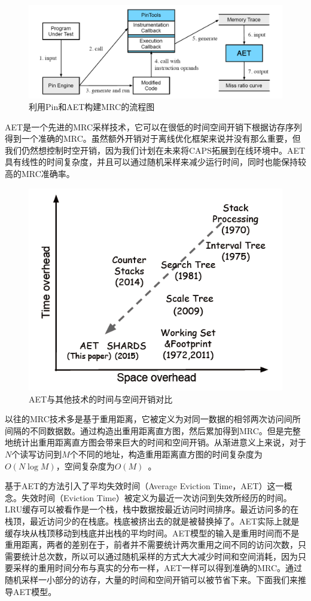 \begin{figure}[htbp] 
    \centering
    \includegraphics[width=0.8\linewidth]{figures/pin.png}
    \caption{利用Pin和AET构建MRC的流程图}
    \label{fig:pin}
\end{figure}

AET是一个先进的MRC采样技术，它可以在很低的时间空间开销下根据访存序列得到一个准确的MRC。虽然额外开销对于离线优化框架来说并没有那么重要，但我们仍然想控制时空开销，因为我们计划在未来将CAPS拓展到在线环境中。AET具有线性的时间复杂度，并且可以通过随机采样来减少运行时间，同时也能保持较高的MRC准确率。

\begin{figure}[htbp] 
    \centering
    \includegraphics[width=0.8\linewidth]{figures/AET_overhead.png}
    \caption{AET与其他技术的时间与空间开销对比}
    \label{fig:AET_overhead}
\end{figure}

以往的MRC技术多是基于重用距离，它被定义为对同一数据的相邻两次访问间所间隔的不同数据数。通过构造出重用距离直方图，然后累加得到MRC。但是完整地统计出重用距离直方图会带来巨大的时间和空间开销。从渐进意义上来说，对于$N$个读写访问到$M$个不同的地址，构造重用距离直方图的时间复杂度为$O(N\log M)$，空间复杂度为$O(M)$~\cite{olken1981efficient}。

基于AET的方法引入了平均失效时间（Average Eviction Time，AET）这一概念。失效时间（Eviction Time）被定义为最近一次访问到失效所经历的时间。LRU缓存可以被看作是一个栈，栈中数据按最近访问时间排序。最近访问多的在栈顶，最近访问少的在栈底。栈底被挤出去的就是被替换掉了。AET实际上就是缓存块从栈顶移动到栈底并出栈的平均时间。AET模型的输入是重用时间而不是重用距离，两者的差别在于，前者并不需要统计两次重用之间不同的访问次数，只需要统计总次数，所以可以通过随机采样的方式大大减少时间和空间消耗，因为只要采样的重用时间分布与真实的分布一样，AET一样可以得到准确的MRC。通过随机采样一小部分的访存，大量的时间和空间开销可以被节省下来。下面我们来推导AET模型。

